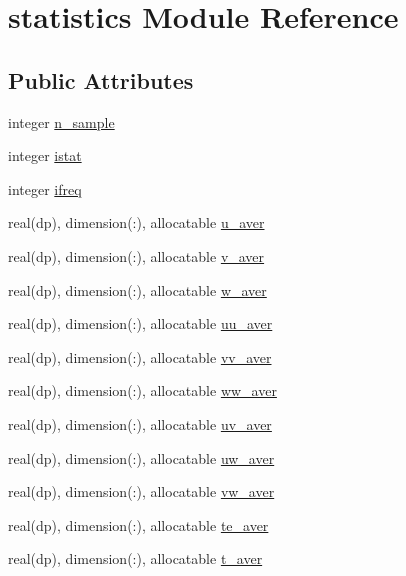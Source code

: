 \hypertarget{classstatistics}{\section{statistics Module Reference}
\label{classstatistics}
}
\subsection*{Public Attributes}
\begin{DoxyCompactItemize}
\item 
integer \hyperlink{classstatistics_a485020773672b32291040ca0044fff27}{n\-\_\-sample}
\item 
integer \hyperlink{classstatistics_ac0feba651e4213ecd0425b1c5a0de80a}{istat}
\item 
integer \hyperlink{classstatistics_afbce262b53b0ec9ab17f770682b7fb35}{ifreq}
\item 
real(dp), dimension(\-:), allocatable \hyperlink{classstatistics_ad94122d3cacddedfe42923a3f3b92c69}{u\-\_\-aver}
\item 
real(dp), dimension(\-:), allocatable \hyperlink{classstatistics_a1b8da3276de56334fdcf742802f8f6e2}{v\-\_\-aver}
\item 
real(dp), dimension(\-:), allocatable \hyperlink{classstatistics_a15ade1ebbda9ffbf25b906dec9f667fc}{w\-\_\-aver}
\item 
real(dp), dimension(\-:), allocatable \hyperlink{classstatistics_a79d376e13ed6870a2f592fba0fb90f07}{uu\-\_\-aver}
\item 
real(dp), dimension(\-:), allocatable \hyperlink{classstatistics_a23adca9074a2f80d8ceb57bbb5edd745}{vv\-\_\-aver}
\item 
real(dp), dimension(\-:), allocatable \hyperlink{classstatistics_a75fda978d2762d39c1c197b1d63bf786}{ww\-\_\-aver}
\item 
real(dp), dimension(\-:), allocatable \hyperlink{classstatistics_ab43692704bce4eafd0dccedc12d43dbf}{uv\-\_\-aver}
\item 
real(dp), dimension(\-:), allocatable \hyperlink{classstatistics_ae392f133c2869e56a9820192215ff81f}{uw\-\_\-aver}
\item 
real(dp), dimension(\-:), allocatable \hyperlink{classstatistics_aa69a50e52610d5da19a676feade82aaf}{vw\-\_\-aver}
\item 
real(dp), dimension(\-:), allocatable \hyperlink{classstatistics_a3140050f5b63e50c892d060d942c2f03}{te\-\_\-aver}
\item 
real(dp), dimension(\-:), allocatable \hyperlink{classstatistics_a19932dbbd083f997879d6ed14d486428}{t\-\_\-aver}

\end{DoxyCompactItemize}
